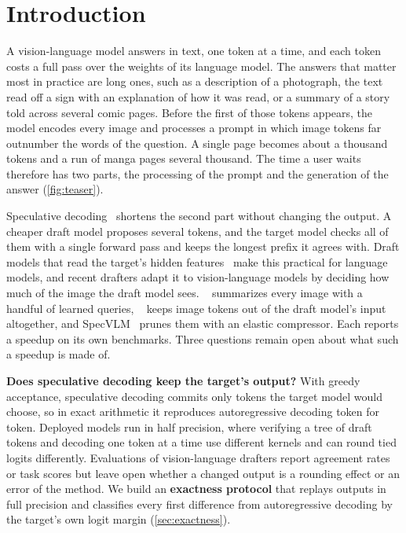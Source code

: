 \section{Introduction}
\label{sec:intro}

 A vision-language model answers in text, one token at a time, and each token costs a full pass over the weights of its language model.
The answers that matter most in practice are long ones, such as a description of a photograph, the text read off a sign with an explanation of how it was read, or a summary of a story told across several comic pages.
Before the first of those tokens appears, the model encodes every image and processes a prompt in which image tokens far outnumber the words of the question.
A single page becomes about a thousand tokens and a run of manga pages several thousand.
The time a user waits therefore has two parts, the processing of the prompt and the generation of the answer (\cref{fig:teaser}).

 Speculative decoding~\cite{leviathan2023fast,chen2023accelerating} shortens the second part without changing the output.
A cheaper draft model proposes several tokens, and the target model checks all of them with a single forward pass and keeps the longest prefix it agrees with.
Draft models that read the target's hidden features~\cite{li2024eagle,li2024eagle2} make this practical for language models, and recent drafters adapt it to vision-language models by deciding how much of the image the draft model sees.
\vispec~\cite{kang2025vispec} summarizes every image with a handful of learned queries, \hivis~\cite{xie2025hivis} keeps image tokens out of the draft model's input altogether, and SpecVLM~\cite{huang2025specvlm} prunes them with an elastic compressor.
Each reports a speedup on its own benchmarks.
Three questions remain open about what such a speedup is made of.

\noindent\textbf{Does speculative decoding keep the target's output?}
With greedy acceptance, speculative decoding commits only tokens the target model would choose, so in exact arithmetic it reproduces autoregressive decoding token for token.
Deployed models run in half precision, where verifying a tree of draft tokens and decoding one token at a time use different kernels and can round tied logits differently.
Evaluations of vision-language drafters report agreement rates or task scores but leave open whether a changed output is a rounding effect or an error of the method.
We build an \textbf{exactness protocol} that replays outputs in full precision and classifies every first difference from autoregressive decoding by the target's own logit margin (\cref{sec:exactness}).

